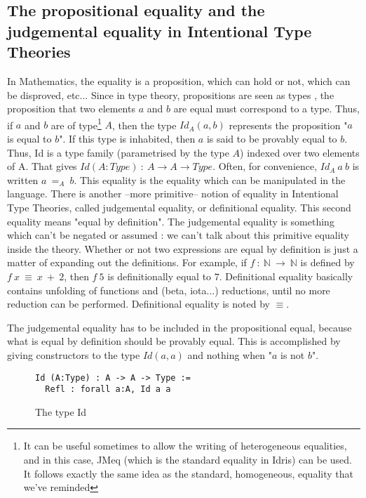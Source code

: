 \subsection{The propositional equality and the judgemental equality in Intentional Type Theories}
In Mathematics, the equality is a proposition, which can hold or not, which can be disproved, etc...
Since in type theory, propositions are seen as types \cite{How80}, the proposition that two elements $a$ and $b$ are equal must correspond to a type. Thus, if $a$ and $b$ are of type\footnote{It can be useful sometimes to allow the writing of heterogeneous equalities, and in this case, JMeq (which is the standard equality in Idris) can be used. It follows exactly the same idea as the standard, homogeneous, equality that we've reminded} $A$, then the type $Id_A(a, b)$ represents the proposition "$a$ is equal to $b$". If this type is inhabited, then $a$ is said to be provably equal to $b$.
Thus, Id is a type family (parametrised by the type $A$) indexed over two elements of A. That gives $Id (A:Type)\ :\ A \rightarrow A \rightarrow Type$. Often, for convenience, $Id_A\ a\ b$ is written $a\ =_A\ b$.
This equality is the equality which can be manipulated in the language. There is another --more primitive-- notion of equality in Intentional Type Theories, called judgemental equality, or definitional equality. This second equality means "equal by definition". The judgemental equality is something which can't be negated or assumed : we can't talk about this primitive equality inside the theory. Whether or not two expressions are equal by definition is just a matter of expanding out the definitions. For example, if $f\ :\ \mathbb{N}\ \rightarrow\ \mathbb{N}$ is defined by $f\ x\ \equiv\ x\ +\ 2$, then $f\ 5$ is definitionally equal to $7$. Definitional equality basically contains unfolding of functions and (beta, iota...) reductions, until no more reduction can be performed.
Definitional equality is noted by $\equiv$.

The judgemental equality has to be included in the propositional equal, because what is equal by definition should be provably equal.
This is accomplished by giving constructors to the type $Id(a,a)$ and nothing when "$a$ is not $b$".
\begin{figure}[H]
\figrule
\begin{center}
\begin{verbatim}
Id (A:Type) : A -> A -> Type :=
  Refl : forall a:A, Id a a
\end{verbatim}
\end{center}
\caption{The type Id}
\figrule
\end{figure}

